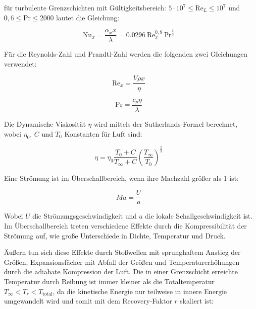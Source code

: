 für turbulente Grenzschichten mit Gültigkeitsbereich: $5 \cdot 10^7 \leq \text{Re}_L \leq 10^7$ und $ 0,6 \leq \text{Pr} \leq 2000$ lautet die Gleichung:

\begin{equation}
  \label{eq:nusselt_turbulent}
  \text{Nu}_x = \frac{\alpha_x x}{\lambda} = \num{0,0296} \ \text{Re}_x^{0,8} \ \text{Pr}^{\frac{1}{3}}
\end{equation}

Für die Reynolds-Zahl und Prandtl-Zahl werden die folgenden zwei Gleichungen verwendet:

\noindent\begin{minipage}{.5\linewidth}
  \begin{equation}
    \label{eq:reynolds}
    \text{Re}_x = \frac{V \rho x}{\eta}
  \end{equation}
\end{minipage}%
\begin{minipage}{.5\linewidth}
  \begin{equation}
    \label{eq:prandtl}
    \text{Pr} = \frac{c_p \eta}{\lambda}
  \end{equation}
\end{minipage}

Die Dynamische Viskosität $\eta$ wird mittels der Sutherlands-Formel berechnet, wobei $\eta_0$, $C$ und $T_0$ Konstanten für Luft sind:

\begin{equation}
  \label{eq:dynamische_viskositaet}
  \eta = \eta_0 \frac{T_0 + C}{T_{\infty} + C} {\left( \frac{T_{\infty}}{T_0} \right)}^{\frac{2}{3}}
\end{equation}

Eine Strömung ist im Überschallbereich, wenn ihre Machzahl größer als 1 ist:

\begin{equation}
  \label{eq:machzahl}
  Ma = \frac{U}{a}
\end{equation}

Wobei $U$ die Strömungsgeschwindigkeit und $a$ die lokale Schallgeschwindigkeit ist. Im Überschallbereich treten verschiedene
Effekte durch die Kompressibilität der Strömung auf, wie große Unterschiede in Dichte, Temperatur und Druck.

Äußern tun sich diese Effekte durch Stoßwellen mit sprunghaftem Anstieg der Größen, Expansionsfächer mit Abfall der Größen und
Temperaturerhöhungen durch die adiabate Kompression der Luft. Die in einer Grenzschicht erreichte Temperatur durch Reibung
ist immer kleiner als die Totaltemperatur $T_{\infty} < T_r < T_\mathrm{total}$, da die kinetische Energie nur teilweise in innere Energie
umgewandelt wird und somit mit dem Recovery-Faktor $r$ skaliert ist:

